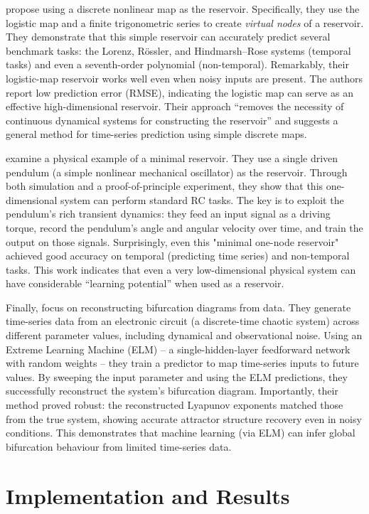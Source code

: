 \documentclass[numbered]{ivt-style/standard}
\begin{document}
\cite{Arun2024} propose using a discrete nonlinear map as the reservoir.  Specifically, they use the logistic map and a finite trigonometric series to create \textit{virtual nodes} of a reservoir.  They demonstrate that this simple reservoir can accurately predict several benchmark tasks: the Lorenz, R\"ossler, and Hindmarsh–Rose systems (temporal tasks) and even a seventh-order polynomial (non-temporal).  Remarkably, their logistic-map reservoir works well even when noisy inputs are present.  The authors report low prediction error (RMSE), indicating the logistic map can serve as an effective high-dimensional reservoir.  Their approach “removes the necessity of continuous dynamical systems for constructing the reservoir” and suggests a general method for time-series prediction using simple discrete maps.

\cite{Mandal2022} examine a physical example of a minimal reservoir.  They use a single driven pendulum (a simple nonlinear mechanical oscillator) as the reservoir.  Through both simulation and a proof-of-principle experiment, they show that this one-dimensional system can perform standard RC tasks.  The key is to exploit the pendulum’s rich transient dynamics: they feed an input signal as a driving torque, record the pendulum’s angle and angular velocity over time, and train the output on those signals.  Surprisingly, even this "minimal one-node reservoir" achieved good accuracy on temporal (predicting time series) and non-temporal tasks.  This work indicates that even a very low-dimensional physical system can have considerable “learning potential” when used as a reservoir.

Finally, \cite{Itoh2020} focus on reconstructing bifurcation diagrams from data.  They generate time-series data from an electronic circuit (a discrete-time chaotic system) across different parameter values, including dynamical and observational noise.  Using an Extreme Learning Machine (ELM) – a single-hidden-layer feedforward network with random weights – they train a predictor to map time-series inputs to future values.  By sweeping the input parameter and using the ELM predictions, they successfully reconstruct the system’s bifurcation diagram.  Importantly, their method proved robust: the reconstructed Lyapunov exponents matched those from the true system, showing accurate attractor structure recovery even in noisy conditions.  This demonstrates that machine learning (via ELM) can infer global bifurcation behaviour from limited time-series data.

\section{Implementation and Results}
\end{document}
